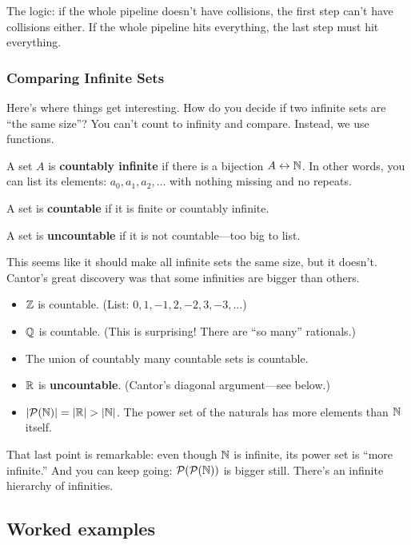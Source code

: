 The logic: if the whole pipeline doesn't have collisions, the first step can't have collisions either. If the whole pipeline hits everything, the last step must hit everything.

\subsubsection*{Comparing Infinite Sets}

Here's where things get interesting. How do you decide if two infinite sets are ``the same size''? You can't count to infinity and compare. Instead, we use functions.

\begin{definition}
A set $A$ is \textbf{countably infinite} if there is a bijection $A \leftrightarrow \mathbb{N}$. In other words, you can list its elements: $a_0, a_1, a_2, \ldots$ with nothing missing and no repeats.

A set is \textbf{countable} if it is finite or countably infinite.

A set is \textbf{uncountable} if it is not countable---too big to list.
\end{definition}

This seems like it should make all infinite sets the same size, but it doesn't. Cantor's great discovery was that some infinities are bigger than others.

\begin{theorem}
\begin{itemize}
  \item $\mathbb{Z}$ is countable. (List: $0, 1, -1, 2, -2, 3, -3, \ldots$)
  \item $\mathbb{Q}$ is countable. (This is surprising! There are ``so many'' rationals.)
  \item The union of countably many countable sets is countable.
  \item $\mathbb{R}$ is \textbf{uncountable}. (Cantor's diagonal argument---see below.)
  \item $|\mathcal{P}(\mathbb{N})| = |\mathbb{R}| > |\mathbb{N}|$. The power set of the naturals has more elements than $\mathbb{N}$ itself.
\end{itemize}
\end{theorem}

That last point is remarkable: even though $\mathbb{N}$ is infinite, its power set is ``more infinite.'' And you can keep going: $\mathcal{P}(\mathcal{P}(\mathbb{N}))$ is bigger still. There's an infinite hierarchy of infinities.

\subsection*{Worked examples}

